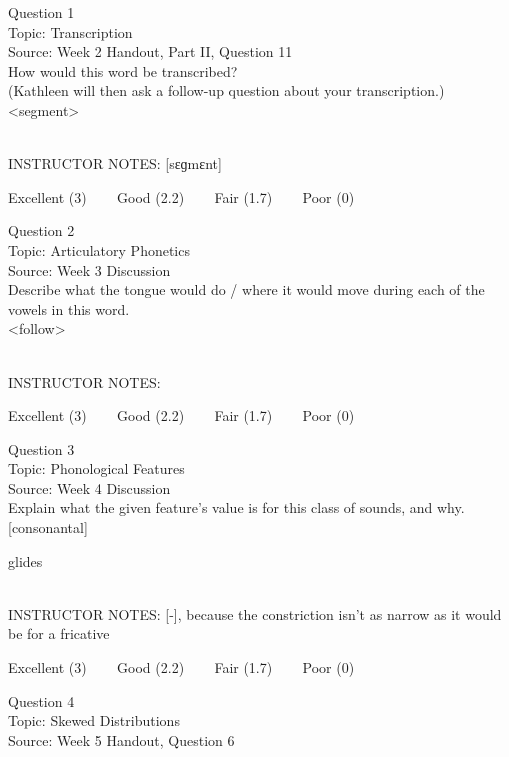 \documentclass[12pt]{article}
\begin{document}
{\large Question 1}\\

Topic: Transcription\\
Source: Week 2 Handout, Part II, Question 11\\

How would this word be transcribed?\\ (Kathleen will then ask a follow-up question about your transcription.)\\

<segment>


~\\
INSTRUCTOR NOTES: [sɛɡmɛnt]


\vfill
Excellent (3) ~~~ Good (2.2) ~~~ Fair (1.7) ~~~ Poor (0)
\newpage

{\large Question 2}\\

Topic: Articulatory Phonetics\\
Source: Week 3 Discussion\\

Describe what the tongue would do / where it would move during each of the vowels in this word.\\

<follow>


~\\
INSTRUCTOR NOTES: 


\vfill
Excellent (3) ~~~ Good (2.2) ~~~ Fair (1.7) ~~~ Poor (0)
\newpage

{\large Question 3}\\

Topic: Phonological Features\\
Source: Week 4 Discussion\\

Explain what the given feature’s value is for this class of sounds, and why.\\

{[consonantal]}

glides


~\\
INSTRUCTOR NOTES: [-], because the constriction isn't as narrow as it would be for a fricative


\vfill
Excellent (3) ~~~ Good (2.2) ~~~ Fair (1.7) ~~~ Poor (0)
\newpage

{\large Question 4}\\

Topic: Skewed Distributions\\
Source: Week 5 Handout, Question 6\\
\end{document}
